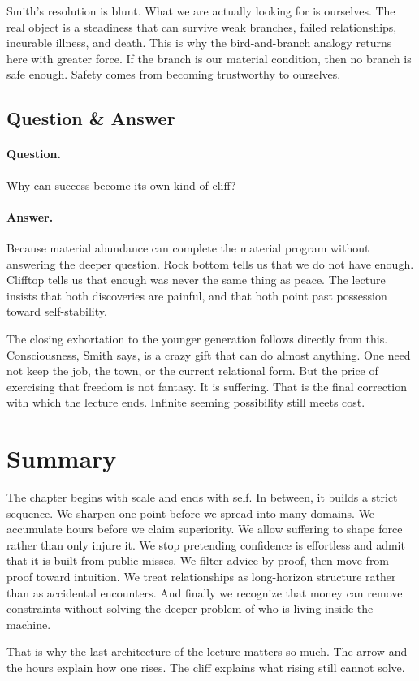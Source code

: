 Smith's resolution is blunt. What we are actually looking for is ourselves. The real object is a steadiness that can survive weak branches, failed relationships, incurable illness, and death. This is why the bird-and-branch analogy returns here with greater force. If the branch is our material condition, then no branch is safe enough. Safety comes from becoming trustworthy to ourselves.

\subsection{Question \& Answer}

\paragraph{Question.} Why can success become its own kind of cliff?

\paragraph{Answer.} Because material abundance can complete the material program without answering the deeper question. Rock bottom tells us that we do not have enough. Clifftop tells us that enough was never the same thing as peace. The lecture insists that both discoveries are painful, and that both point past possession toward self-stability.

The closing exhortation to the younger generation follows directly from this. Consciousness, Smith says, is a crazy gift that can do almost anything. One need not keep the job, the town, or the current relational form. But the price of exercising that freedom is not fantasy. It is suffering. That is the final correction with which the lecture ends. Infinite seeming possibility still meets cost.

\section{Summary}

The chapter begins with scale and ends with self. In between, it builds a strict sequence. We sharpen one point before we spread into many domains. We accumulate hours before we claim superiority. We allow suffering to shape force rather than only injure it. We stop pretending confidence is effortless and admit that it is built from public misses. We filter advice by proof, then move from proof toward intuition. We treat relationships as long-horizon structure rather than as accidental encounters. And finally we recognize that money can remove constraints without solving the deeper problem of who is living inside the machine.

That is why the last architecture of the lecture matters so much. The arrow and the hours explain how one rises. The cliff explains what rising still cannot solve.